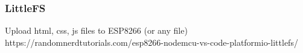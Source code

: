 \subsubsection{LittleFS}
Upload html, css, js files to ESP8266 (or any file)
https://randomnerdtutorials.com/esp8266-nodemcu-vs-code-platformio-littlefs/